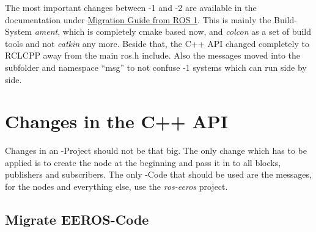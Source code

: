 
The most important changes between -1 and -2 are available in the documentation under \href{http://docs.ros.org/en/humble/The-ROS2-Project/Contributing/Migration-Guide.html}{Migration Guide from ROS 1}.
This is mainly the Build-System \textit{ament}, which is completely cmake based now, and \textit{colcon} as a set of build tools and not \textit{catkin} any more.
Beside that, the C++ API changed completely to RCLCPP away from the main ros.h include.
Also the messages moved into the subfolder and namespace ``msg'' to not confuse -1 systems which can run side by side.


\section[C++ API]{Changes in the C++ API} \label{sec:cpp-api-changes}

Changes in an -Project should not be that big. The only change which has to be applied is to create the node at the beginning and pass it in to all blocks, publishers and subscribers.
The only -Code that should be used are the messages, for the nodes and everything else, use the \textit{ros-eeros} project.


\subsection[EEOR-Migration]{Migrate EEROS-Code} \label{sec:cpp-eeros-migration}


